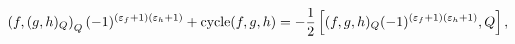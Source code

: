 \begin{equation}
\left(  f,(g,h)_{Q}\right)  _{Q}(-1)^{(\varepsilon_{f}+1)(\varepsilon_{h}%
+1)}+\hbox{cycle}(f,g,h)=-\frac{1}{2}\left[(f,g,h)_{Q}
(-1)^{(\varepsilon_{f}+1)(\varepsilon_{h}+1)},Q\right]  ,\label{1.6}%
\end{equation}

